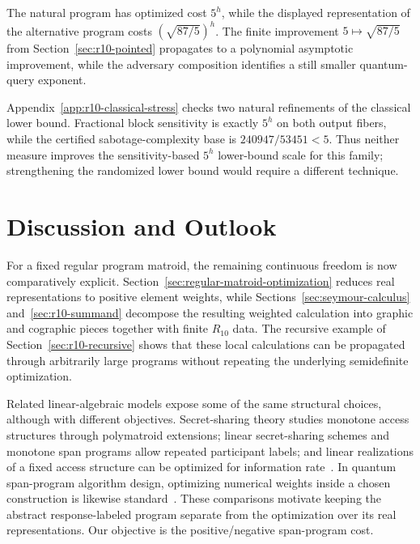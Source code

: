 \documentclass[11pt]{article}
\numberwithin{equation}{section}
\theoremstyle{remark}
\begin{document}
The natural program has optimized cost $5^h$, while the displayed
representation of the alternative program costs $(\sqrt{87/5})^h$.
The finite improvement
$5\mapsto\sqrt{87/5}$ from Section~\ref{sec:r10-pointed} propagates
to a polynomial asymptotic improvement, while the adversary composition
identifies a still smaller quantum-query exponent.

Appendix~\ref{app:r10-classical-stress} checks two natural refinements of the
classical lower bound. Fractional block sensitivity is exactly $5^h$ on both
output fibers, while the certified sabotage-complexity base is
$240947/53451<5$. Thus neither measure improves the sensitivity-based
$5^h$ lower-bound scale for this family; strengthening the randomized lower
bound would require a different technique.

\section{Discussion and Outlook}
\label{sec:discussion}

For a fixed regular program matroid, the remaining continuous freedom is now
comparatively explicit. Section~\ref{sec:regular-matroid-optimization}
reduces real representations to positive element weights, while
Sections~\ref{sec:seymour-calculus} and~\ref{sec:r10-summand} decompose the
resulting weighted calculation into graphic and cographic pieces together
with finite $R_{10}$ data. The recursive example of
Section~\ref{sec:r10-recursive} shows that these local calculations can be
propagated through arbitrarily large programs without repeating the
underlying semidefinite optimization.

Related linear-algebraic models expose some of the same structural choices,
although with different objectives. Secret-sharing theory studies monotone
access structures through polymatroid extensions; linear secret-sharing
schemes and monotone span programs allow repeated participant labels; and
linear realizations of a fixed access structure can be optimized for
information rate~\cite{FarrasMartiFarrePadro2012,CramerEtAl2008,
Beimel2011SecretSharingSurvey,TangGaoZhang2013}. In quantum span-program
algorithm design, optimizing numerical weights inside a chosen construction
is likewise standard~\cite{ReichardtSpalek2008,CornelissenMandePatro2025}.
These comparisons motivate keeping the abstract response-labeled program
separate from the optimization over its real representations. Our objective
is the positive/negative span-program cost.
\end{document}
